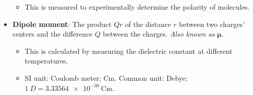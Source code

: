 \documentclass[../main.tex]{subfiles}
\begin{document}
\begin{itemize}
    \begin{itemize}
        \item This is measured to experimentally determine the polarity of molecules.
    \end{itemize}
    \item \textbf{Dipole moment}: The product $Qr$ of the distance $r$ between two charges' centers and the difference $Q$ between the charges. \emph{Also known as} $\bm{\mu}$.
    \begin{itemize}
        \item This is calculated by measuring the dielectric constant at different temperatures.
        \item SI unit: Coulomb meter; $\si{\coulomb\meter}$. Common unit: Debye; $\SI{1}{D}=\SI{3.33564e-30}{\coulomb\meter}$.
    \end{itemize}
\end{itemize}
\end{document}
